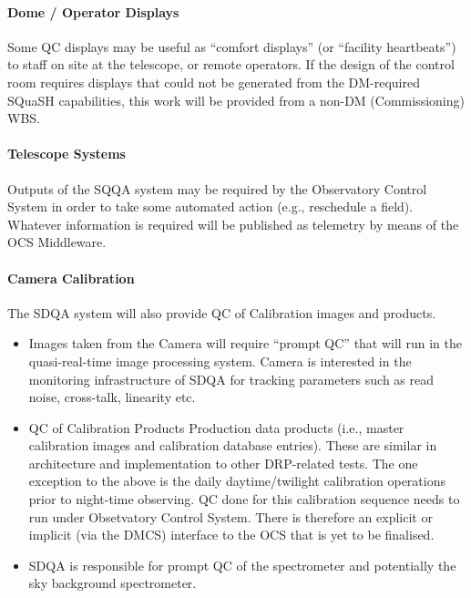 \paragraph{Dome / Operator Displays}
\label{sec:qaDomeDisplay}

Some QC displays may be useful as ``comfort displays'' (or ``facility heartbeats'') to staff on site at the telescope, or remote operators. If the design of the control room requires displays that could not be generated from the DM-required SQuaSH capabilities, this work will be provided from a non-DM (Commissioning) WBS.

\paragraph{Telescope Systems}
\label{sec:qaTelescopeSystem}

Outputs of the SQQA system may be required by the Observatory Control System in order to take some automated action (e.g., reschedule a field). Whatever information is required will be published as telemetry by means of the OCS Middleware.

\paragraph{Camera Calibration}
\label{sec:qaCameraCalibration}

The SDQA system will also provide QC of Calibration images and products.

\begin{itemize}

\item Images taken from the Camera will require ``prompt QC'' that will run in the quasi-real-time image processing system. Camera is interested in the monitoring infrastructure of SDQA for tracking parameters such as read noise, cross-talk, linearity etc.

\item QC of Calibration Products Production data products (i.e., master calibration images and calibration database entries). These are similar in architecture and implementation to other DRP-related tests. The one exception to the above is the daily daytime/twilight calibration operations prior to night-time observing. QC done for this calibration sequence needs to run under Obsetvatory Control System. There is therefore an explicit or implicit (via the DMCS) interface to the OCS that is yet to be finalised.

\item SDQA is responsible for prompt QC of the spectrometer and potentially the sky background spectrometer.

\end{itemize}

